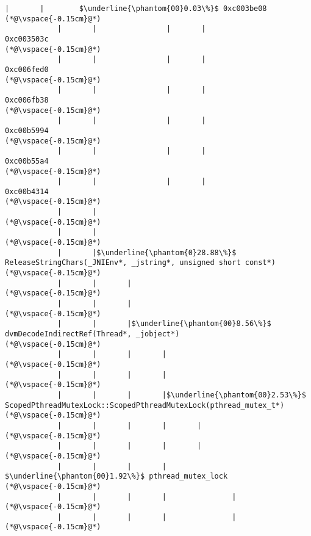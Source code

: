 \begin{lstlisting}[caption=Unicode-merkkijonon osoitinoperaatio, label=profile:C2JReadUnicode-512, numberbychapter=true, frame=lines, float, floatplacement=t]
            |       |        $\underline{\phantom{00}0.03\%}$ 0xc003be08
(*@\vspace{-0.15cm}@*)
            |       |                |       |               0xc003503c
(*@\vspace{-0.15cm}@*)
            |       |                |       |               0xc006fed0
(*@\vspace{-0.15cm}@*)
            |       |                |       |               0xc006fb38
(*@\vspace{-0.15cm}@*)
            |       |                |       |               0xc00b5994
(*@\vspace{-0.15cm}@*)
            |       |                |       |               0xc00b55a4
(*@\vspace{-0.15cm}@*)
            |       |                |       |               0xc00b4314
(*@\vspace{-0.15cm}@*)
            |       |
(*@\vspace{-0.15cm}@*)
            |       |
(*@\vspace{-0.15cm}@*)
            |       |$\underline{\phantom{0}28.88\%}$ ReleaseStringChars(_JNIEnv*, _jstring*, unsigned short const*)
(*@\vspace{-0.15cm}@*)
            |       |       |
(*@\vspace{-0.15cm}@*)
            |       |       |
(*@\vspace{-0.15cm}@*)
            |       |       |$\underline{\phantom{00}8.56\%}$ dvmDecodeIndirectRef(Thread*, _jobject*)
(*@\vspace{-0.15cm}@*)
            |       |       |       |
(*@\vspace{-0.15cm}@*)
            |       |       |       |
(*@\vspace{-0.15cm}@*)
            |       |       |       |$\underline{\phantom{00}2.53\%}$ ScopedPthreadMutexLock::ScopedPthreadMutexLock(pthread_mutex_t*)
(*@\vspace{-0.15cm}@*)
            |       |       |       |       |
(*@\vspace{-0.15cm}@*)
            |       |       |       |       |
(*@\vspace{-0.15cm}@*)
            |       |       |       |        $\underline{\phantom{00}1.92\%}$ pthread_mutex_lock
(*@\vspace{-0.15cm}@*)
            |       |       |       |               |
(*@\vspace{-0.15cm}@*)
            |       |       |       |               |
(*@\vspace{-0.15cm}@*)

\end{lstlisting}
